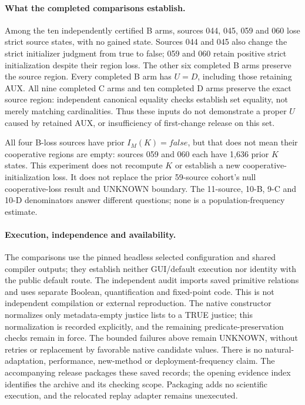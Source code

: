 \endgroup

\paragraph{What the completed comparisons establish.}
Among the ten independently certified B arms, sources 044, 045, 059 and
060 lose strict source states, with no gained state. Sources 044 and 045
also change the strict initializer judgment from true to false; 059 and
060 retain positive strict initialization despite their region loss.
The other six completed B arms preserve the source region. Every completed
B arm has $U=D$, including those retaining AUX. All nine completed C arms
and ten completed D arms preserve the exact source region: independent
canonical equality checks establish set equality, not merely matching
cardinalities. Thus these inputs do not demonstrate a proper $U$ caused
by retained AUX, or insufficiency of first-change release on this set.

All four B-loss sources have prior $I_M(K)=\mathit{false}$, but that does
not mean their cooperative regions are empty: sources 059 and 060 each
have 1,636 prior $K$ states. This experiment does not recompute $K$ or
establish a new cooperative-initialization loss. It does not replace the
prior 59-source cohort's null cooperative-loss result and UNKNOWN boundary.
The 11-source, 10-B, 9-C and 10-D denominators answer different questions;
none is a population-frequency estimate.

\paragraph{Execution, independence and availability.}
The comparisons use the pinned headless selected configuration and shared
compiler outputs; they establish neither GUI/default execution nor
identity with the public default route. The independent audit imports
saved primitive relations and uses separate Boolean, quantification and
fixed-point code. This is not independent compilation or external
reproduction. The native constructor normalizes only metadata-empty
justice lists to a TRUE justice; this normalization is recorded explicitly,
and the remaining predicate-preservation checks remain in force.
The bounded failures above remain UNKNOWN, without retries or replacement
by favorable native candidate values. There is no natural-adaptation,
performance, new-method or deployment-frequency claim. The accompanying
release packages these saved records; the opening evidence index identifies
the archive and its checking scope. Packaging adds no scientific execution,
and the relocated replay adapter remains unexecuted.
